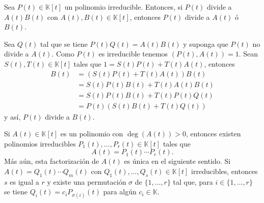 \begin{lema}
Sea $P(t)\in \mathbb{K}[t]$ un polinomio irreducible. Entonces, si $P(t)$ divide a $A(t)B(t)$ con $A(t),B(t)\in \mathbb{K}[t]$, entonces $P(t)$ divide a $A(t)$ \'o $B(t)$.
\end{lema}

\dem Sea $Q(t)$ tal que se tiene $P(t)Q(t)=A(t)B(t)$ y suponga que $P(t)$ no divide a $A(t)$. Como $P(t)$ es irreducible tenemos $\left(P(t),A(t)\right)=1$. Sean $S(t),T(t)\in \mathbb{K}[t]$ tales que $1=S(t)P(t)+T(t)A(t)$, entonces
\begin{align*}
B(t) & =(S(t)P(t)+T(t)A(t))B(t)\\
& =S(t)P(t)B(t)+T(t)A(t)B(t)\\
& =S(t)P(t)B(t)+T(t)P(t)Q(t)\\
& =P(t)\left(S(t)B(t)+T(t)Q(t)\right)
\end{align*}
y así, $P(t)$ divide a $B(t)$.

\begin{teo}
Si $A(t)\in \mathbb{K}[t]$ es un polinomio con $\deg(A(t))>0$, entonces existen polinomios irreducibles $P_1(t),\ldots,P_r(t)\in \mathbb{K}[t]$ tales que
$$A(t)=P_1(t)\cdots P_r(t).$$
Más aún, esta factorización de $A(t)$ es única en el siguiente sentido. Si $A(t)=Q_1(t)\cdots Q_m(t)$ con $Q_1(t),\ldots,Q_s(t)\in \mathbb{K}[t]$ irreducibles, entonces $s$ es igual a $r$ y existe una permutación $\sigma$ de $\{1,\ldots,r\}$ tal que, para $i\in\{1,\ldots,r\}$ se tiene $Q_i(t)=c_iP_{\sigma(i)}(t)$ para algún $c_i\in \mathbb{K}$.
\end{teo}

